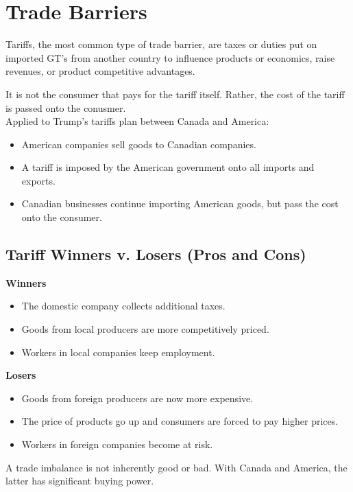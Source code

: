 \section{Trade Barriers}

\begin{definition}[Tariff]
Tariffs, the most common type of trade barrier, are taxes 
or duties put on imported GT's from another country to influence 
products or economics, raise revenues, or product competitive advantages.
\end{definition}

It is not the consumer that pays for the tariff itself. Rather,
the cost of the tariff is passed onto the conusmer.\\ 

Applied to Trump's tariffs plan between Canada and America:
\begin{itemize}
    \item American companies sell goods to Canadian companies.
    \item A tariff is imposed by the American government onto all imports and exports.
    \item Canadian businesses continue importing American goods, but pass the cost onto the consumer.
\end{itemize}

\subsection{Tariff Winners v. Losers (Pros and Cons)}
\textbf{Winners}
\begin{itemize}
    \item The domestic company collects additional taxes.
    \item Goods from local producers are more competitively priced.
    \item Workers in local companies keep employment.
\end{itemize}
\textbf{Losers}
\begin{itemize}
    \item Goods from foreign producers are now more expensive.
    \item The price of products go up and consumers are forced to pay higher prices.
    \item Workers in foreign companies become at risk.
\end{itemize}

A trade imbalance is not inherently good or bad.
With Canada and America, the latter has significant buying power.

